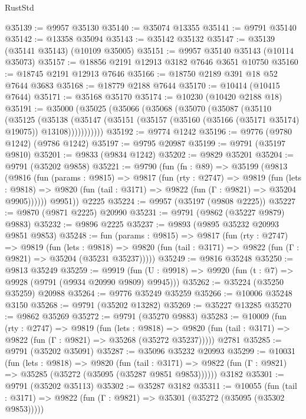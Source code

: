\begin{lexlean}{RustStd}
\begin{coremodule}
@35139 := @9957 @35130
@35140 := @35074 @13355
@35141 := @9791 @35140
@35142 := @13358 @35094
@35143 := @35142 @35132
@35147 := @35139 (@35141 @35143) (@10109 @35005)
@35151 := @9957 @35140 @35143 (@10114 @35073)
@35157 := @18856 @2191 @12913 @3182 @7646 @3651 @10750
@35160 := @18745 @2191 @12913 @7646
@35166 := @18750 @2189 @391 @18 @52 @7644 @3683
@35168 := @18779 @2188 @7644
@35170 := @10414 (@10415 @7644)
@35171 := @35168 @35170
@35174 := @10230 (@10420 @2188 @18)
@35191 := @35000
    (@35025
      (@35066
        (@35068
          (@35070
            (@35087
              (@35110
                (@35125
                  (@35138
                    (@35147
                      (@35151 (@35157 (@35160 (@35166 (@35171 @35174) @19075)) @13108)))))))))))
@35192 := @9774 @1242
@35196 := @9776 (@9780 @1242) (@9786 @1242)
@35197 := @9795 @20987
@35199 := @9791 (@35197 @9810)
@35201 := @9833 (@9834 @1242)
@35202 := @9829 @35201
@35204 := @9791 (@35202 @9858)
@35221 := @9790
    (fun (fn : @89) =>
    @35199
      (@9813
        (@9816
          (fun (params : @9815) =>
          @9817
            (fun (rty : @2747) =>
            @9819
              (fun (lets : @9818) =>
              @9820 (fun (tail : @3171) => @9822 (fun (Γ : @9821) => @35204 @9905))))))
        @9951))
    @2225
@35224 := @9957 (@35197 (@9808 @2225))
@35227 := @9870 (@9871 @2225) @20990
@35231 := @9791 (@9862 (@35227 @9879) @9883)
@35232 := @9896 @2225
@35237 := @9893 (@9895 @35232 @20993 @9851 @9853)
@35248 := fun (params : @9815) =>
  @9817
    (fun (rty : @2747) =>
    @9819
      (fun (lets : @9818) =>
      @9820 (fun (tail : @3171) => @9822 (fun (Γ : @9821) => @35204 (@35231 @35237)))))
@35249 := @9816 @35248
@35250 := @9813 @35249
@35259 := @9919
    (fun (U : @9918) => @9920 (fun (t : @7) => @9928 (@9791 (@9934 @20990 @9809) @9945)))
@35262 := @35224 (@35250 @35259) @20988
@35264 := @9776 @35249 @35259
@35266 := @10006 @35248 @3150
@35268 := @9791 (@35202 @13282)
@35269 := @35227 @13285
@35270 := @9862 @35269
@35272 := @9791 (@35270 @9883)
@35283 := @10009
    (fun (rty : @2747) =>
    @9819
      (fun (lets : @9818) =>
      @9820 (fun (tail : @3171) => @9822 (fun (Γ : @9821) => @35268 (@35272 @35237)))))
    @2781
@35285 := @9791 (@35202 @35091)
@35287 := @35096 @35232 @20993
@35299 := @10031
    (fun (lets : @9818) =>
    @9820
      (fun (tail : @3171) =>
      @9822 (fun (Γ : @9821) => @35285 (@35272 (@35095 (@35287 @9851 @9853))))))
    @3182
@35301 := @9791 (@35202 @35113)
@35302 := @35287 @3182
@35311 := @10055
    (fun (tail : @3171) => @9822 (fun (Γ : @9821) => @35301 (@35272 (@35095 (@35302 @9853)))))

\end{coremodule}
\end{lexlean}
